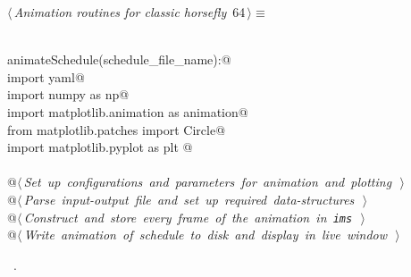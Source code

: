 \documentclass[11.5pt]{report}
\begin{document}
\begin{flushleft} \small
\begin{minipage}{\linewidth}\label{scrap92}\raggedright\small
{} $\langle\,${\itshape Animation routines for classic horsefly}\nobreak\ {\footnotesize {64}}$\,\rangle\equiv$
\vspace{-1ex}
\begin{list}{}{} \item
\mbox{}\verb@@\\
\mbox{}\verb@def animateSchedule(schedule_file_name):@\\
\mbox{}\verb@     import yaml@\\
\mbox{}\verb@     import numpy as np@\\
\mbox{}\verb@     import matplotlib.animation as animation@\\
\mbox{}\verb@     from matplotlib.patches import Circle@\\
\mbox{}\verb@     import matplotlib.pyplot as plt @\\
\mbox{}\verb@@\\
\mbox{}\verb@     @\hbox{$\langle\,${\itshape Set up configurations and parameters for animation and plotting}\nobreak\ {\footnotesize {}}$\,\rangle$}\verb@@\\
\mbox{}\verb@     @\hbox{$\langle\,${\itshape Parse input-output file and set up required data-structures}\nobreak\ {\footnotesize {}}$\,\rangle$}\verb@@\\
\mbox{}\verb@     @\hbox{$\langle\,${\itshape Construct and store every frame of the animation in \verb|ims|}\nobreak\ {\footnotesize {}}$\,\rangle$}\verb@@\\
\mbox{}\verb@     @\hbox{$\langle\,${\itshape Write animation of schedule to disk and display in live window}\nobreak\ {\footnotesize {}}$\,\rangle$}\verb@@\\
\mbox{}\verb@@{\NWsep}
\end{list}
\vspace{-1.5ex}
\footnotesize
\begin{list}{}{\setlength{\itemsep}{-\parsep}\setlength{\itemindent}{-\leftmargin}}
\item \NWtxtMacroRefIn\ .

\item{}
\end{list}
\end{minipage}\vspace{4ex}
\end{flushleft}
\end{document}
